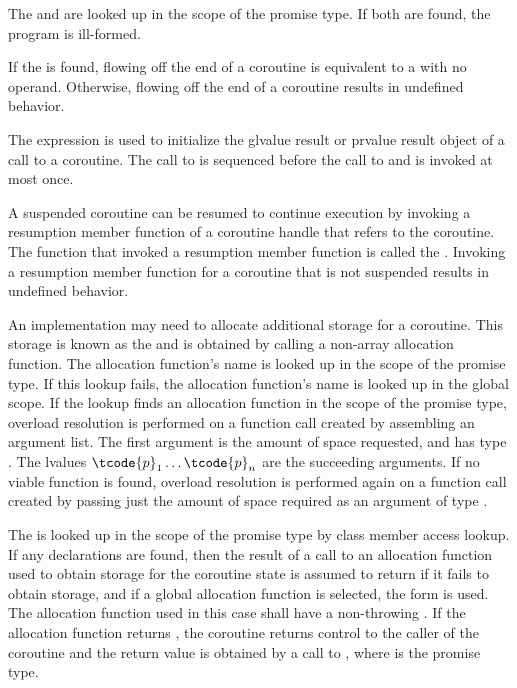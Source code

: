 \pnum
The  
and  are looked up in the scope of the promise type.
If both are found, the program is ill-formed.
\begin{note}
If the   is found, flowing off
the end of a coroutine is equivalent to a  with no operand.
Otherwise, flowing off the end of a coroutine
results in undefined behavior.
\end{note}

\pnum
The expression  is used
to initialize
the glvalue result or prvalue result object of a call to a coroutine.
The call to 
is sequenced before
the call to 
and is invoked at most once.

\pnum
A suspended coroutine can be resumed to continue execution by invoking
a resumption member function
of a coroutine handle
that refers to the coroutine.
The function that invoked a resumption member function is
called the .
Invoking a resumption member function for a coroutine
that is not suspended results in undefined behavior.

\pnum
An implementation may need to allocate additional storage for a coroutine.
This storage is known as the  and is obtained by calling
a non-array allocation function.
The allocation function's name is looked up in the scope of the promise type.
If this lookup fails, the allocation function's name is looked up in the
global scope.
If the lookup finds an allocation function in the scope of the promise type,
overload resolution is performed on a function call created by assembling an
argument list. The first argument is the amount of space requested, and has
type .
The lvalues $\tcode{p}_1 \dotsc \tcode{p}_n$ are the succeeding arguments.
If no viable function is found,
overload resolution is performed again
on a function call created by passing just
the amount of space required as an argument of type .

\pnum
The  
is looked up in the scope of the promise type by class member access
lookup.
If any declarations are found, then the result
of a call to an allocation function used to obtain storage for the coroutine
state is assumed to return  if it fails to obtain storage,
and if a global allocation function is selected,
the  form is used.
The allocation function used in this case shall have a non-throwing
.
If the allocation function returns , the coroutine returns
control to the caller of the coroutine and the return value is obtained by a
call to , where 
is the promise type.

